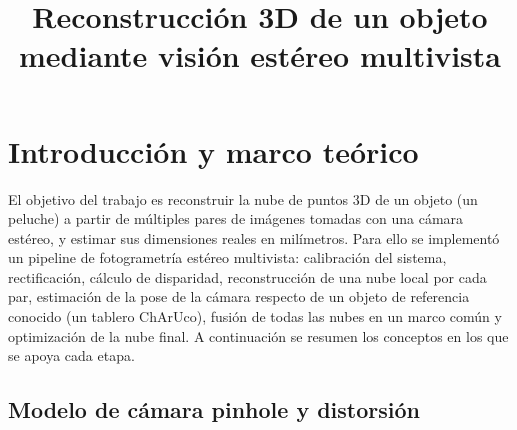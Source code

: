 \documentclass[conference]{IEEEtran}
\begin{document}
\title{Reconstrucción 3D de un objeto mediante visión estéreo multivista}

\author{
}

\maketitle

\section{Introducción y marco teórico}

El objetivo del trabajo es reconstruir la nube de puntos 3D de un objeto
(un peluche) a partir de múltiples pares de imágenes tomadas con una cámara
estéreo, y estimar sus dimensiones reales en milímetros. Para ello se
implementó un pipeline de fotogrametría estéreo multivista: calibración del
sistema, rectificación, cálculo de disparidad, reconstrucción de una nube
local por cada par, estimación de la pose de la cámara respecto de un objeto
de referencia conocido (un tablero ChArUco), fusión de todas las nubes en un
marco común y optimización de la nube final. A continuación se resumen los
conceptos en los que se apoya cada etapa.

\subsection{Modelo de cámara pinhole y distorsión}
\end{document}
